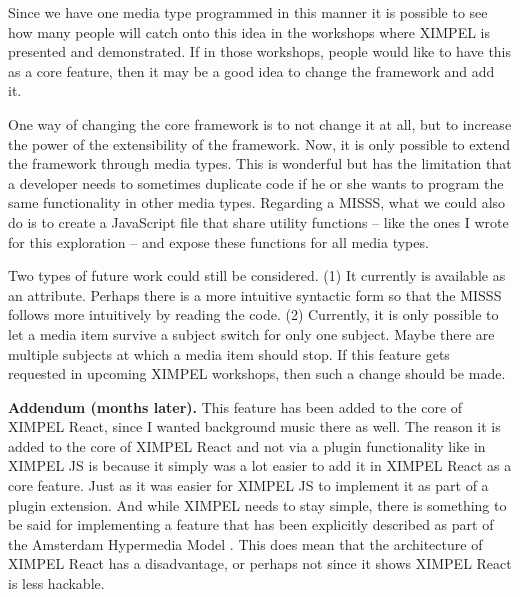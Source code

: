 Since we have one media type programmed in this manner it is possible to see how many people will catch onto this idea in the workshops where XIMPEL is presented and demonstrated. If in those workshops, people would like to have this as a core feature, then it may be a good idea to change the framework and add it.

One way of changing the core framework is to not change it at all, but to increase the power of the extensibility of the framework. Now, it is only possible to extend the framework through media types. This is wonderful but has the limitation that a developer needs to sometimes duplicate code if he or she wants to program the same functionality in other media types. Regarding a MISSS, what we could also do is to create a JavaScript file that share utility functions -- like the ones I wrote for this exploration -- and expose these functions for all media types.

Two types of future work could still be considered. (1) It currently is available as an attribute. Perhaps there is a more intuitive syntactic form so that the MISSS follows more intuitively by reading the code. (2) Currently, it is only possible to let a media item survive a subject switch for only one subject. Maybe there are multiple subjects at which a media item should stop. If this feature gets requested in upcoming XIMPEL workshops, then such a change should be made. 

\textbf{Addendum (months later).} This feature has been added to the core of XIMPEL React, since I wanted background music there as well. The reason it is added to the core of XIMPEL React and not via a plugin functionality like in XIMPEL JS is because it simply was a lot easier to add it in XIMPEL React as a core feature. Just as it was easier for XIMPEL JS to implement it as part of a plugin extension. And while XIMPEL needs to stay simple, there is something to be said for implementing a feature that has been explicitly described as part of the Amsterdam Hypermedia Model \cite{hardman1994}. This does mean that the architecture of XIMPEL React has a disadvantage, or perhaps not since it shows XIMPEL React is less hackable.